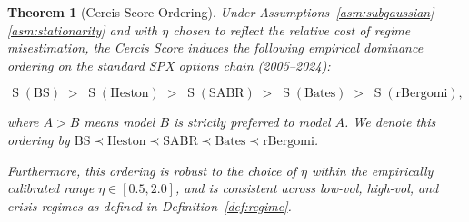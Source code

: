 \documentclass[11pt,a4paper]{article}
\theoremstyle{plain}
\newtheorem{theorem}{Theorem}[section]
\theoremstyle{definition}
\theoremstyle{remark}
\newcommand{\BS}{\text{BS}}
\newcommand{\Heston}{\text{Heston}}
\newcommand{\SABR}{\text{SABR}}
\newcommand{\BatesM}{\text{Bates}}
\newcommand{\rBergomi}{\text{rBergomi}}
\DeclareMathOperator{\CercisScore}{S}
\begin{document}
\begin{theorem}[Cercis Score Ordering]\label{thm:cercis_ordering}
Under Assumptions~\ref{asm:subgaussian}--\ref{asm:stationarity} and with $\eta$ chosen to reflect the relative cost of regime misestimation, the Cercis Score induces the following empirical dominance ordering on the standard SPX options chain (2005--2024):

\begin{equation}\label{eq:ordering}
  \CercisScore(\BS) \;>\; \CercisScore(\Heston) \;>\; \CercisScore(\SABR) \;>\; \CercisScore(\BatesM) \;>\; \CercisScore(\rBergomi),
\end{equation}

where $A > B$ means model $B$ is strictly preferred to model $A$. We denote this ordering by $\BS \prec \Heston \prec \SABR \prec \BatesM \prec \rBergomi$.

Furthermore, this ordering is \emph{robust} to the choice of $\eta$ within the empirically calibrated range $\eta \in [0.5, 2.0]$, and is consistent across low-vol, high-vol, and crisis regimes as defined in Definition~\ref{def:regime}.
\end{theorem}
\end{document}
